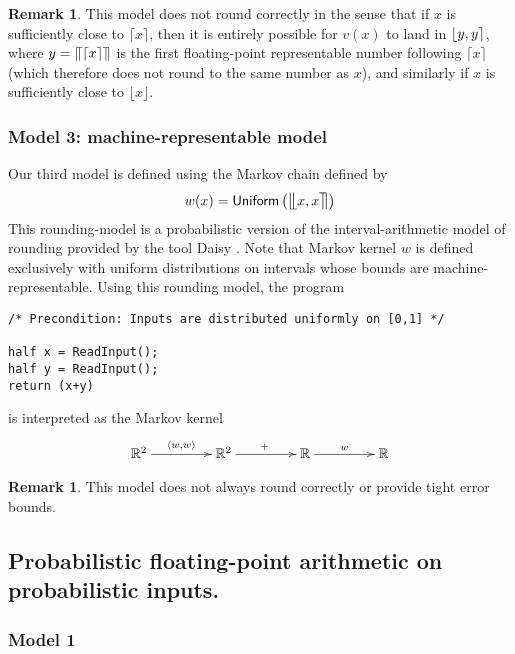 \documentclass[10pt,a4paper]{article}
\theoremstyle{plain}
\theoremstyle{definition}
\newtheorem{remark}[theorem]{Remark}
\newcommand{\R}{\mathbb{R}}
\newcommand{\Unif}{\mathsf{Uniform}}
\newcommand{\ceil}[1]{\lceil #1 \rceil}
\newcommand{\floor}[1]{\lfloor #1 \rfloor}
\newcommand{\cceil}[1]{\llceil #1 \rrceil}
\newcommand{\fintvl}[1][x]{\mathlarger{\lfloor}#1,#1\mathlarger{\rceil}}
\newcommand{\ffintvl}[1][x]{\mathlarger{\llfloor}#1,#1\mathlarger{\rrceil}}
\begin{document}
\begin{remark}
This model does not round correctly in the sense that if $x$ is sufficiently close to $\ceil{x}$, then it is entirely possible for $v(x)$ to land in $\fintvl[y]$, where $y=\cceil{\ceil{x}}$ is the  first floating-point representable number following $\ceil{x}$ (which therefore does not round to the same number as $x$), and similarly if $x$ is sufficiently close to $\floor{x}$.
\end{remark}



\subsubsection{Model 3: machine-representable model}

Our third model is defined using the Markov chain defined by
\[
w(x)=\Unif\left(\ffintvl\right)
\]
This rounding-model is a probabilistic version of the interval-arithmetic model of rounding provided by the tool Daisy \cite{darulova2018daisy}. Note that Markov kernel $w$ is defined exclusively with uniform distributions on intervals whose bounds are machine-representable. Using this rounding model, the program 
\begin{lstlisting}
/* Precondition: Inputs are distributed uniformly on [0,1] */

half x = ReadInput();
half y = ReadInput();
return (x+y) 
\end{lstlisting}
is interpreted as the Markov kernel
\[
\xymatrix@C=10ex
{
\R^2 \ar[r]^{\langle w,w\rangle} & \R^2\ar[r]^{+} & \R\ar[r]^{w} & \R
}
\]

\begin{remark}
This model does not always round correctly or provide tight error bounds.
\end{remark}

\subsection{Probabilistic floating-point arithmetic on probabilistic inputs.}


\subsubsection{Model 1}
\end{document}
